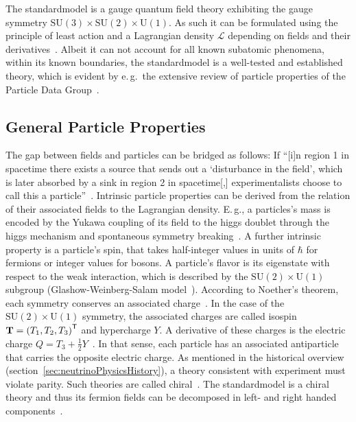 The \gls{standardmodel} is a gauge quantum field theory exhibiting the gauge symmetry $\text{SU}(3)\times\text{SU}(2)\times\text{U}(1)$. As such it can be formulated using the principle of least action and a Lagrangian density $\mathcal{L}$ depending on fields and their derivatives~\cite{zee2003quantum}. Albeit it can not account for all known subatomic phenomena, within its known boundaries, the \gls{standardmodel} is a well-tested and established theory, which is evident by e.\,g.~the extensive review of particle properties of the Particle Data Group~\cite{ReviewOfParticlePhysics}.

\subsection{General Particle Properties}
\label{sec:neutrinoPhysicsStandardModelParticleProperties}
The gap between fields and particles can be bridged as follows: If ``[i]n region 1 in spacetime there exists a source that sends out a `disturbance in the field', which is later absorbed by a sink in region 2 in spacetime[,] experimentalists choose to call this a particle''~\cite{zee2003quantum}. Intrinsic particle properties can be derived from the relation of their associated fields to the Lagrangian density. E.\,g., a particles's mass is encoded by the Yukawa coupling of its field to the higgs doublet through the higgs mechanism and spontaneous symmetry breaking~\cite{Higgs:1964pj}. A further intrinsic property is a particle's spin, that takes half-integer values in units of $\hbar$ for fermions or integer values for bosons. A particle's flavor is its eigenstate with respect to the weak interaction, which is described by the $\text{SU}(2)\times\text{U}(1)$ subgroup (Glashow-Weinberg-Salam model~\cite{Glashow:1961,Weinberg1967,Salam:1968}). According to Noether's theorem, each symmetry conserves an associated charge~\cite{Noether1918}. In the case of the $\text{SU}(2)\times\text{U}(1)$ symmetry, the associated charges are called isospin $\boldsymbol{\mathbf{T}}={(T_1, T_2, T_3)}^{\mathsf{T}}$ and hypercharge $Y$. A derivative of these charges is the electric charge $Q=T_3+\frac{1}{2}Y$~\cite{Wouter2019}. In that sense, each particle has an associated antiparticle that carries the opposite electric charge. As mentioned in the historical overview (section~\ref{sec:neutrinoPhysicsHistory}), a theory consistent with experiment must violate parity. Such theories are called chiral~\cite{zee2003quantum}. The \gls{standardmodel} is a chiral theory and thus its fermion fields can be decomposed in left- and right handed components~\cite{Wouter2019}. 

